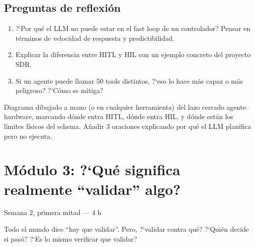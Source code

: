 \documentclass[11pt,a4paper]{article}
\newcommand{\timeest}[1]{\textsf{\footnotesize\color{muted}#1}}
\begin{document}
\subsection{Preguntas de reflexi\'on}
\begin{enumerate}[label=\textbf{R\arabic*.}]
  \item ?`Por qu\'e el LLM no puede estar en el fast loop de un controlador? Pensar en t\'erminos de velocidad de respuesta y predictibilidad.
  \item Explicar la diferencia entre HITL y HIL con un ejemplo concreto del proyecto SDR.
  \item Si un agente puede llamar 50 tools distintos, ?`eso lo hace m\'as capaz o m\'as peligroso? ?`C\'omo se mitiga?
\end{enumerate}

\begin{deliverbox}[Entregable]
Diagrama dibujado a mano (o en cualquier herramienta) del lazo cerrado agente--hardware, marcando d\'onde entra HITL, d\'onde entra HIL, y d\'onde est\'an los l\'imites f\'isicos del schema. A\~nadir 3 oraciones explicando por qu\'e el LLM planifica pero no ejecuta.
\end{deliverbox}

\section{M\'odulo 3: ?`Qu\'e significa realmente ``validar'' algo?}
\timeest{Semana 2, primera mitad --- 4 h}

\begin{goalbox}
Todo el mundo dice ``hay que validar''. Pero, ?`validar contra qu\'e? ?`Qui\'en decide si pas\'o? ?`Es lo mismo verificar que validar?
\end{goalbox}
\end{document}

